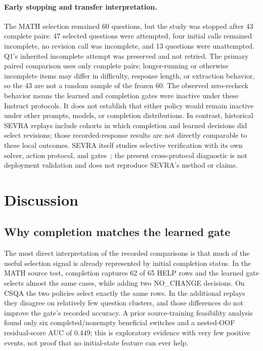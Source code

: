 \documentclass[conference]{IEEEtran}
\begin{document}
\paragraph{Early stopping and transfer interpretation.} The MATH selection remained 60 questions, but the study was stopped after 43 complete pairs: 47 selected questions were attempted, four initial calls remained incomplete, no revision call was incomplete, and 13 questions were unattempted. Q1's inherited incomplete attempt was preserved and not retried. The primary paired comparison uses only complete pairs; longer-running or otherwise incomplete items may differ in difficulty, response length, or extraction behavior, so the 43 are not a random sample of the frozen 60. The observed zero-recheck behavior means the learned and completion gates were inactive under these Instruct protocols. It does not establish that either policy would remain inactive under other prompts, models, or completion distributions. In contrast, historical SEVRA replays include cohorts in which completion and learned decisions did select revisions; those recorded-response results are not directly comparable to these local outcomes. SEVRA itself studies selective verification with its own solver, action protocol, and gates~\cite{dip2026sevra}; the present cross-protocol diagnostic is not deployment validation and does not reproduce SEVRA's method or claims.

\section{Discussion}
\subsection{Why completion matches the learned gate}
The most direct interpretation of the recorded comparisons is that much of the useful selection signal is already represented by initial completion status. In the MATH source test, completion captures 62 of 65 HELP rows and the learned gate selects almost the same cases, while adding two NO\_CHANGE decisions. On CSQA the two policies select exactly the same rows. In the additional replays they disagree on relatively few question clusters, and those differences do not improve the gate's recorded accuracy. A prior source-training feasibility analysis found only six completed/nonempty beneficial switches and a nested-OOF residual-score AUC of 0.449; this is exploratory evidence with very few positive events, not proof that no initial-state feature can ever help.
\end{document}
